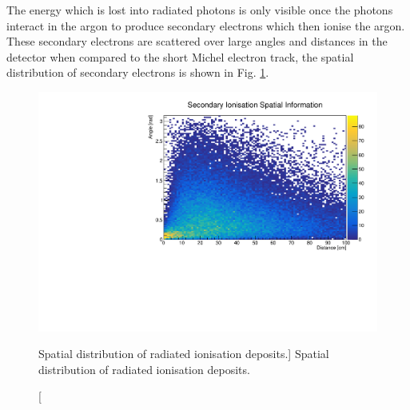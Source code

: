 

The energy which is lost into radiated photons is only visible once the photons
interact in the argon to produce secondary electrons which then ionise the
argon. These secondary electrons are scattered over large angles and distances
in the detector when compared to the short Michel electron track, the spatial 
distribution of secondary electrons is shown in Fig. \ref{fig:photon_geom}.
\begin{figure}
	\centering
	\includegraphics[width=\textwidth]{figures/photon_geom.pdf}
	\caption
	[Spatial distribution of radiated ionisation deposits.]
	{Spatial distribution of radiated ionisation deposits.}
	\label{fig:photon_geom}
\end{figure}

